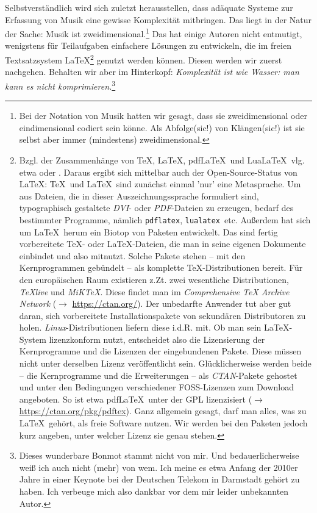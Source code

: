 \documentclass[
  DIV=calc,
  BCOR=5mm,
  12pt,
  headings=small,
  twoside,
  abstract=true,
  toc=bib,
  xcolor=dvipsnames,
  openany,
  english,ngerman]{scrbook}
\newcommand{\acc}[0]{\textit}
\begin{document}
Selbstverständlich wird sich zuletzt herausstellen, dass adäquate Systeme zur
Erfassung von Musik eine gewisse Komplexität mitbringen. Das liegt in der Natur
der Sache: Musik ist zweidimensional.\footnote{Bei der Notation von Musik hatten
wir gesagt, dass sie zweidimensional oder eindimensional codiert sein könne.
Als Abfolge(sic!) von Klängen(sic!) ist sie selbst aber immer (mindestens)
zweidimensional.} Das hat einige Autoren nicht entmutigt, wenigstens für
Teilaufgaben einfachere Lösungen zu entwickeln, die im freien Textsatzsystem
\LaTeX\footnote{Bzgl. der Zusammenhänge von \TeX, \LaTeX, pdf\LaTeX\ und
Lua\LaTeX\ vlg. etwa \cite[][7ff]{Voss2018a} oder \cite[][8ff]{Voss2012a}.
Daraus ergibt sich mittelbar auch der Open-Source-Status von \LaTeX: \TeX\ und
\LaTeX\ sind zunächst einmal 'nur' eine Metasprache. Um aus Dateien, die in
dieser Auszeichnungssprache formuliert sind, typographisch gestaltete \acc{DVI}-
oder \acc{PDF}-Dateien zu erzeugen, bedarf des bestimmter Programme, nämlich
\texttt{pdflatex}, \texttt{lualatex}\ etc. Außerdem hat sich um \LaTeX\ herum ein
Biotop von Paketen entwickelt. Das sind fertig vorbereitete \TeX- oder
\LaTeX-Dateien, die man in seine eigenen Dokumente einbindet und also mitnutzt.
Solche Pakete stehen -- mit den Kernprogrammen gebündelt -- als komplette
\TeX-Distributionen bereit. Für den europäischen Raum existieren z.Zt. zwei
wesentliche Distributionen, \acc{{\TeX}live} und \acc{MiK{\TeX}}. Diese findet
man im \acc{Comprehensive TeX Archive Network} ($\rightarrow$
\href{https://ctan.org/}{https://ctan.org/}). Der unbedarfte Anwender tut aber
gut daran, sich vorbereitete Installationspakete von sekundären Distributoren zu
holen. \acc{Linux}-Distributionen liefern diese i.d.R. mit. Ob man sein
\LaTeX-System lizenzkonform nutzt, entscheidet also die Lizensierung der
Kernprogramme und die Lizenzen der eingebundenen Pakete. Diese müssen nicht
unter derselben Lizenz veröffentlicht sein. Glücklicherweise werden beide -- die
Kernprogramme und die Erweiterungen -- als \acc{CTAN}-Pakete gehostet und unter
den Bedingungen verschiedener FOSS-Lizenzen zum Download angeboten. So ist etwa
pdf\LaTeX\ unter der GPL lizenzisiert ($\rightarrow$
\href{https://ctan.org/pkg/pdftex} {https://ctan.org/pkg/pdftex}). Ganz
allgemein gesagt, darf man alles, was zu \LaTeX\ gehört, als freie Software
nutzen. Wir werden bei den Paketen jedoch kurz angeben, unter welcher Lizenz sie
genau stehen.} genutzt werden können.
Diesen werden wir zuerst nachgehen. Behalten wir aber im Hinterkopf:
\acc{Komplexität ist wie Wasser: man kann es nicht
komprimieren.}\footnote{Dieses wunderbare Bonmot stammt nicht von mir. Und
bedauerlicherweise weiß ich auch nicht (mehr) von wem. Ich meine es etwa Anfang
der 2010er Jahre in einer Keynote bei der Deutschen Telekom in Darmstadt gehört
zu haben. Ich verbeuge mich also dankbar vor dem mir leider unbekannten Autor.}
\end{document}
